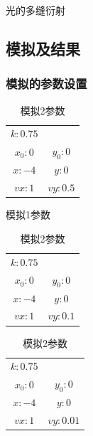 \documentclass[10pt,a4paper]{article}
\begin{document}
\begin{algorithm}[H]
 \caption{光的多缝衍射}
\end{algorithm}
\subsection{模拟及结果}
\subsubsection{模拟的参数设置}
\begin{table}[H]
\begin{minipage}[b]{0.2\linewidth}\centering
\begin{tabular}{cc}
\hline
$k: 0.75$ &\\
$x_0: 0$ &$y_0: 0$\\
$x: -4$ &$y: 0$\\
$vx: 1$&$vy: 0.5$\\
\hline
\end{tabular}

\caption{模拟1参数}\label{tab:1}
\end{minipage}
\hspace{0.5cm}
\begin{minipage}[b]{0.2\linewidth}\centering
\begin{tabular}{cc}
\hline
$k: 0.75$ &\\
$x_0: 0$ &$y_0: 0$\\
$x: -4$ &$y: 0$\\
$vx: 1$&$vy: 0.1$\\
\hline
\end{tabular}

\caption{模拟2参数}\label{tab:2}
\end{minipage}
\hspace{0.5cm}
\begin{minipage}[b]{0.2\linewidth}\centering
\begin{tabular}{cc}
\hline
$k: 0.75$ &\\
$x_0: 0$ &$y_0: 0$\\
$x: -4$ &$y: 0$\\
$vx: 1$&$vy: 0.01$\\
\hline
\end{tabular}


\end{minipage}
\end{table}
\end{document}
